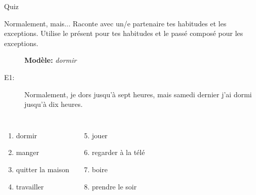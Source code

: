 \documentclass{beamer}
\begin{document}
  \begin{frame}{}
    \begin{center}
      \Large Quiz
    \end{center}
  \end{frame}

  \begin{frame}{Normalement, mais...}
    Raconte avec un/e partenaire tes habitudes et les exceptions.
    Utilise \alert{le présent} pour tes habitudes et \alert{le passé composé} pour les exceptions. \\
    \begin{description}
      \item[] \textbf{Modèle:} \emph{dormir}
      \item[E1:] Normalement, je \alert{dors} jusqu'à sept heures, mais samedi dernier j'\alert{ai dormi} jusqu'à dix heures.
    \end{description}
    \begin{columns}[t]
        \begin{enumerate}
          \item dormir
          \item manger
          \item quitter la maison
          \item travailler
        \end{enumerate}
        \begin{enumerate}
          \setcounter{enumi}{4}
          \item jouer
          \item regarder à la télé
          \item boire
          \item prendre le soir
        \end{enumerate}
    \end{columns}
  \end{frame}
\end{document}
